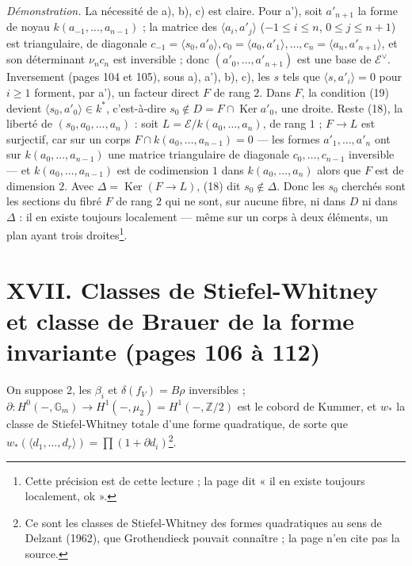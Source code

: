 \documentclass[11pt,a4paper]{article}
\begin{document}
\emph{Démonstration.} La nécessité de a), b), c) est claire. Pour a'), soit
$a'_{n+1}$ la forme de noyau $k(a_{-1}, \ldots, a_{n-1})$ ; la matrice des
$\langle a_i, a'_{j} \rangle$ ($-1 \leqslant i \leqslant n$, $0 \leqslant j
\leqslant n+1$) est triangulaire, de diagonale $c_{-1} = \langle s_0, a'_0
\rangle, c_0 = \langle a_0, a'_1 \rangle, \ldots, c_n = \langle a_n, a'_{n+1}
\rangle$, et son déterminant $\nu_n c_n$ est inversible ; donc $(a'_0, \ldots,
a'_{n+1})$ est une base de $\mathcal{E}^\vee$. Inversement (pages 104 et 105),
sous a), a'), b), c), les $s$ tels que $\langle s, a'_i \rangle = 0$ pour $i
\geqslant 1$ forment, par a'), un facteur direct $F$ de rang $2$. Dans $F$,
la condition (19) devient $\langle s_0, a'_0 \rangle \in k^*$, c'est-à-dire
$s_0 \notin D = F \cap \operatorname{Ker} a'_0$, une droite. Reste (18), la
liberté de $(s_0, a_0, \ldots, a_n)$ : soit $L = \mathcal{E}/k(a_0, \ldots,
a_n)$, de rang $1$ ; $F \to L$ est surjectif, car sur un corps $F \cap k(a_0,
\ldots, a_{n-1}) = 0$ --- les formes $a'_1, \ldots, a'_n$ ont sur $k(a_0, \ldots,
a_{n-1})$ une matrice triangulaire de diagonale $c_0, \ldots, c_{n-1}$
inversible --- et $k(a_0, \ldots, a_{n-1})$ est de codimension $1$ dans $k(a_0,
\ldots, a_n)$ alors que $F$ est de dimension $2$. Avec $\Delta =
\operatorname{Ker}(F \to L)$, (18) dit $s_0 \notin \Delta$. Donc les $s_0$
cherchés sont les sections du fibré $F$ de rang $2$ qui ne sont, sur aucune
fibre, ni dans $D$ ni dans $\Delta$ : il en existe toujours localement --- même
sur un corps à deux éléments, un plan ayant trois droites\footnote{Cette
précision est de cette lecture ; la page dit « il en existe toujours localement,
ok ».}.

\section*{XVII. Classes de Stiefel-Whitney et classe de Brauer de la forme invariante (pages 106 à 112)}

On suppose $2$, les $\beta_i$ et $\delta(f_V) = B\rho$ inversibles ; $\partial
\colon H^0(-, \mathbb{G}_m) \to H^1(-, \mu_2) = H^1(-, \mathbb{Z}/2)$ est le
cobord de Kummer, et $w_*$ la classe de Stiefel-Whitney totale d'une forme
quadratique, de sorte que $w_*(\langle d_1, \ldots, d_r \rangle) = \prod (1 +
\partial d_i)$\footnote{Ce sont les classes de Stiefel-Whitney des formes
quadratiques au sens de Delzant (1962), que Grothendieck pouvait connaître ;
la page n'en cite pas la source.}.
\end{document}
